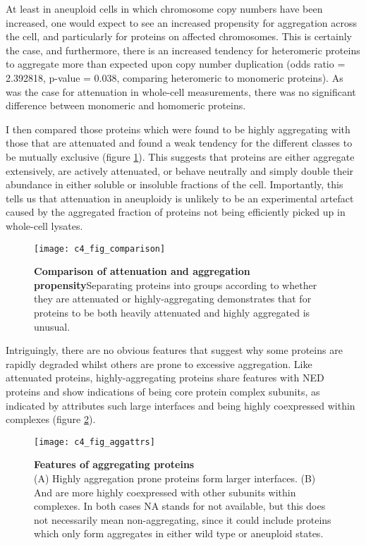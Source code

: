 \documentclass[a4paper,11pt,twoside,openright]{scrbook}
\begin{document}
At least in aneuploid cells in which chromosome copy numbers have been increased, one would expect to see an increased propensity for aggregation across the cell, and particularly for proteins on affected chromosomes. This is certainly the case, and furthermore, there is an increased tendency for heteromeric proteins to aggregate more than expected upon copy number duplication (odds ratio = 2.392818, p-value = 0.038, comparing heteromeric to monomeric proteins). As was the case for attenuation in whole-cell measurements, there was no significant difference between monomeric and homomeric proteins.

I then compared those proteins which were found to be highly aggregating with those that are attenuated and found a weak tendency for the different classes to be mutually exclusive (figure \ref{figure:aneuploidy_comparison}). This suggests that proteins are either aggregate extensively, are actively attenuated, or behave neutrally and simply double their abundance in either soluble or insoluble fractions of the cell. Importantly, this tells us that attenuation in aneuploidy is unlikely to be an experimental artefact caused by the aggregated fraction of proteins not being efficiently picked up in whole-cell lysates.

\begin{figure}[h]
\fcapsideright
    {\caption[Comparison of attenuation and aggregation propensity]{\sffamily\textbf{Comparison of attenuation and aggregation propensity}\newline \small Separating proteins into groups according to whether they are attenuated or highly-aggregating demonstrates that for proteins to be both heavily attenuated and highly aggregated is unusual.}\label{figure:aneuploidy_comparison}}
    {\texttt{[image: c4\_fig\_comparison]}}
\end{figure}

Intriguingly, there are no obvious features that suggest why some proteins are rapidly degraded whilst others are prone to excessive aggregation. Like attenuated proteins, highly-aggregating proteins share features with NED proteins and show indications of being core protein complex subunits, as indicated by attributes such large interfaces and being highly coexpressed within complexes (figure \ref{figure:aneuploidy_aggattrs}).

\begin{figure}[h]
    \texttt{[image: c4\_fig\_aggattrs]}
    \caption[Features of aggregating proteins]{\sffamily \textbf{Features of aggregating proteins} \\ \small (A) Highly aggregation prone proteins form larger interfaces. (B) And are more highly coexpressed with other subunits within complexes. In both cases NA stands for not available, but this does not necessarily mean non-aggregating, since it could include proteins which only form aggregates in either wild type or aneuploid states.}
    \label{figure:aneuploidy_aggattrs}
\end{figure}
\end{document}
